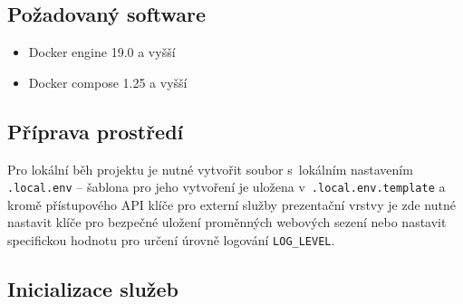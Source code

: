 \documentclass[10pt,a4paper,titlepage]{extarticle}
\begin{document}
    \subsection{Požadovaný software}\label{requirements}

    \begin{itemize}
        \itemsep1pt\parskip0pt
        \item Docker engine 19.0 a vyšší
        \item Docker compose 1.25 a vyšší
    \end{itemize}

    \subsection{Příprava prostředí}\label{env-reqs}

    Pro lokální běh projektu je nutné vytvořit soubor s~lokálním nastavením \texttt{.local.env} -- šablona pro jeho
    vytvoření je uložena v~\texttt{.local.env.template} a kromě přístupového API klíče pro externí služby prezentační
    vrstvy je
     zde nutné nastavit klíče pro bezpečné uložení proměnných webových sezení nebo nastavit specifickou hodnotu pro
     určení úrovně logování \texttt{LOG\_LEVEL}.

    \subsection{Inicializace služeb}\label{initialization-of-services}
\end{document}

